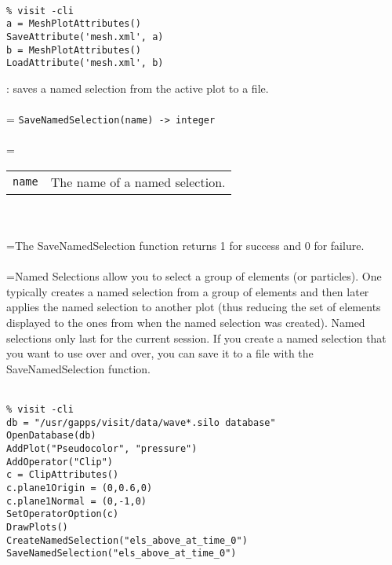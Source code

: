 \documentclass[10pt,a4paper]{report}
\begin{document}
\\[-6mm]
\begin{verbatim}% visit -cli
a = MeshPlotAttributes()
SaveAttribute('mesh.xml', a)
b = MeshPlotAttributes()
LoadAttribute('mesh.xml', b)
\end{verbatim}
\newpage


{}
: saves a named selection from the active plot to a file.\\[-3mm]

 \\ 
\hangindent=\parindent 
\verb!SaveNamedSelection(name) -> integer!\\ [-3mm]

 \\ 
\hangindent=\parindent 
\begin{tabular}{ll}
\verb!name! & The name of a named selection. \\
\end{tabular} \\[-2mm]


 \\ 
\hangindent=\parindent The SaveNamedSelection function returns 1 for success and 0 for failure. \\[-3mm] 

 \\ 
\hangindent=\parindent Named Selections allow you to select a group of elements (or particles). One typically creates a named selection from a group of elements and then later applies the named selection to another plot (thus reducing the set of elements displayed to the ones from when the named selection was created).  Named selections only last for the current session.  If you  create a named selection that you want to use over and over, you can save it to a file with the SaveNamedSelection function. \\[-3mm] 

\\[-6mm]
\begin{verbatim}% visit -cli
db = "/usr/gapps/visit/data/wave*.silo database"
OpenDatabase(db)
AddPlot("Pseudocolor", "pressure")
AddOperator("Clip")
c = ClipAttributes()
c.plane1Origin = (0,0.6,0)
c.plane1Normal = (0,-1,0)
SetOperatorOption(c)
DrawPlots()
CreateNamedSelection("els_above_at_time_0")
SaveNamedSelection("els_above_at_time_0")
\end{verbatim}
\newpage
\end{document}
